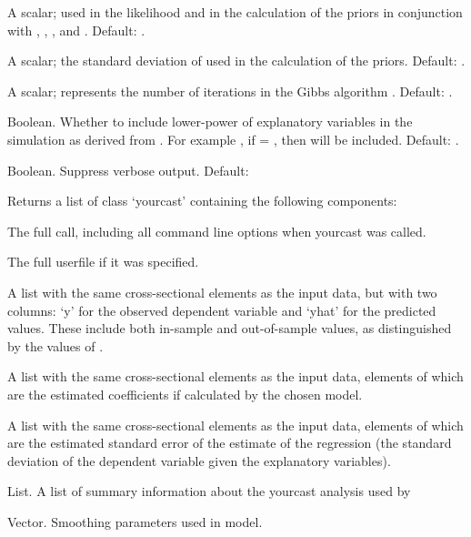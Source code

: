 \begin{Arguments}
\begin{ldescription}
\item[\code{LI.sigma.mean}] A scalar; used in the likelihood and in the
calculation of the priors in conjunction with ,
, , and .
Default: .

\item[\code{LI.sigma.sd}] A scalar; the standard deviation of
 used in the calculation of the priors. Default: .

\item[\code{nsample}] A scalar; represents the number of iterations in the
Gibbs algorithm . Default: .

\item[\code{low.pow}] Boolean. Whether to include lower-power of explanatory
variables in the simulation as derived from . For
example , if  = , then
 will be included. Default: .

\item[\code{verbose}] Boolean. Suppress verbose output. Default: 
\end{ldescription}
\end{Arguments}
%
\begin{Value}
Returns a list of class `yourcast' containing the following components: 

\begin{ldescription}
\item[\code{call}] The full call, including all command line options when
yourcast was called.

\item[\code{userfile}] The full userfile if it was specified.

\item[\code{yhat}] A list with the same cross-sectional elements as the input
data, but with two columns: `y' for the observed dependent
variable and `yhat' for the predicted values. These include both
in-sample and out-of-sample values, as distinguished by the values of
.

\item[\code{coeff}] A list with the same cross-sectional elements as the
input data, elements of which are the estimated coefficients if
calculated by the chosen model.

\item[\code{sigma}] A list with the same cross-sectional elements as the
input data, elements of which are the estimated standard error of
the estimate of the regression (the standard deviation of the
dependent variable given the explanatory variables).

\item[\code{aux}] List. A list of summary information about the yourcast analysis
used by 

\item[\code{params}] Vector. Smoothing parameters used in model.

\end{ldescription}
\end{Value}
